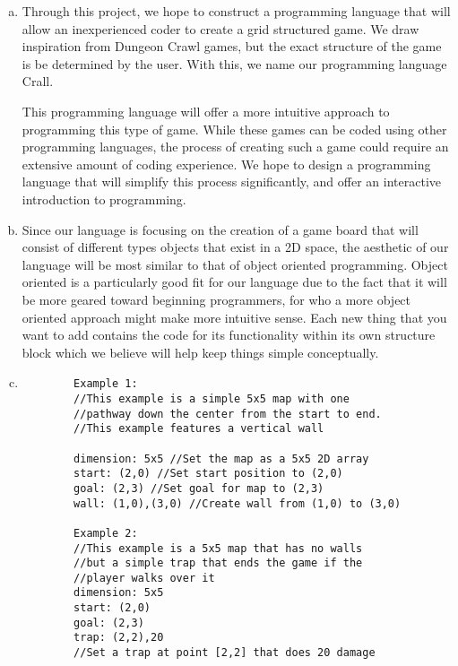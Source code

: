 \documentclass[10pt]{article}
\begin{document}
    \begin{enumerate}[a)]
        \item
        Through this project, we hope to construct a programming language that will allow an inexperienced coder to create a grid structured game. We draw inspiration from Dungeon Crawl games, but the exact structure of the game is be determined by the user. With this, we name our programming language Crall.
 
	    This programming language will offer a more intuitive approach to programming this type of game. While these games can be coded using other programming languages, the process of creating such a game could require an extensive amount of coding experience. We hope to design a programming language that will simplify this process significantly, and offer an interactive introduction to programming.
	    
        \item
        Since our language is focusing on the creation of a game board that will consist of different types objects that exist in a 2D space, the aesthetic of our language will be most similar to that of object oriented programming. Object oriented is a particularly good fit for our language due to the fact that it will be more geared toward beginning programmers, for who a more object oriented approach might make more intuitive sense. Each new thing that you want to add contains the code for its functionality within its own structure block which we believe will help keep things simple conceptually.

    \item
	\begin{verbatim}
		Example 1: 
		//This example is a simple 5x5 map with one 
		//pathway down the center from the start to end.
		//This example features a vertical wall
		
		dimension: 5x5 //Set the map as a 5x5 2D array
		start: (2,0) //Set start position to (2,0)
		goal: (2,3) //Set goal for map to (2,3)
		wall: (1,0),(3,0) //Create wall from (1,0) to (3,0)

		Example 2: 
		//This example is a 5x5 map that has no walls 
		//but a simple trap that ends the game if the 
		//player walks over it
		dimension: 5x5
		start: (2,0)
		goal: (2,3)
		trap: (2,2),20
		//Set a trap at point [2,2] that does 20 damage


\end{verbatim}
\end{enumerate}
\end{document}
